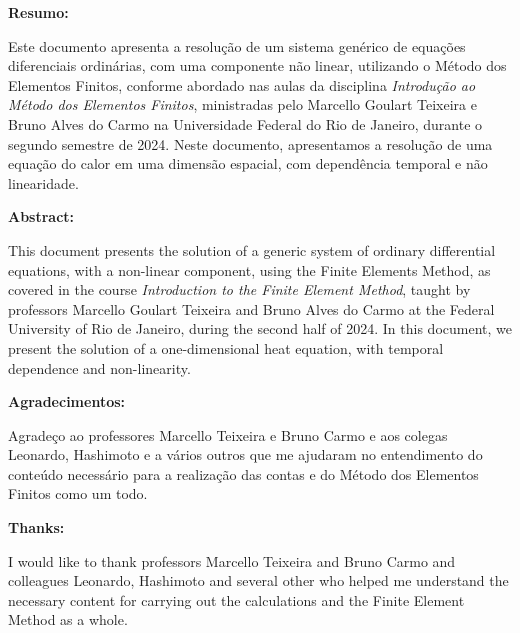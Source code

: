 \maketitle
\newpage

\begin{center}
  \textbf{Resumo:}
\end{center}

Este documento apresenta a resolução de um sistema genérico de equações diferenciais ordinárias, com uma componente não linear, utilizando o Método dos Elementos Finitos, conforme abordado nas aulas da disciplina \textit{Introdução ao Método dos Elementos Finitos}, ministradas pelo Marcello Goulart Teixeira e Bruno Alves do Carmo na Universidade Federal do Rio de Janeiro, durante o segundo semestre de 2024. Neste documento, apresentamos a resolução de uma equação do calor em uma dimensão espacial, com dependência temporal e não linearidade.

\vspace{0.3cm}

\begin{center}
  \textbf{Abstract:}
\end{center}

This document presents the solution of a generic system of ordinary differential equations, with a non-linear component, using the Finite Elements Method, as covered in the course \textit{Introduction to the Finite Element Method}, taught by professors Marcello Goulart Teixeira and Bruno Alves do Carmo at the Federal University of Rio de Janeiro, during the second half of 2024. In this document, we present the solution of a one-dimensional heat equation, with temporal dependence and non-linearity.

\vspace{0.3cm}

\begin{center}
  \textbf{Agradecimentos:}
\end{center}

  Agradeço ao professores Marcello Teixeira e Bruno Carmo e aos colegas Leonardo, Hashimoto e a vários outros que me ajudaram no entendimento do conteúdo necessário para a realização das contas e do Método dos Elementos Finitos como um todo.

\vspace{0.3cm}

\begin{center}
  \textbf{Thanks:}
\end{center}

  I would like to thank professors Marcello Teixeira and Bruno Carmo and colleagues Leonardo, Hashimoto and several other who helped me understand the necessary content for carrying out the calculations and the Finite Element Method as a whole.

\newpage
\tableofcontents
\newpage

